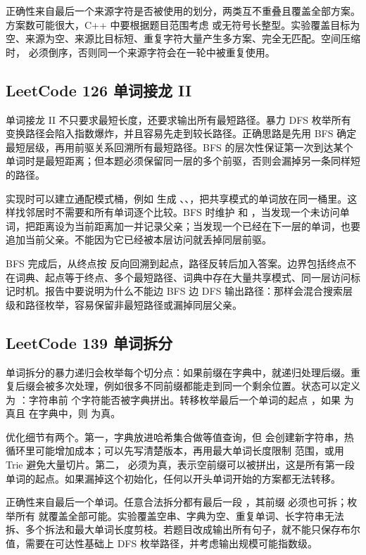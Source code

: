 正确性来自最后一个来源字符是否被使用的划分，两类互不重叠且覆盖全部方案。方案数可能很大，C++ 中要根据题目范围考虑  或无符号长整型。实验覆盖目标为空、来源为空、来源比目标短、重复字符大量产生多方案、完全无匹配。空间压缩时， 必须倒序，否则同一个来源字符会在一轮中被重复使用。

\subsection{LeetCode 126 单词接龙 II}

单词接龙 II 不只要求最短长度，还要求输出所有最短路径。暴力 DFS 枚举所有变换路径会陷入指数爆炸，并且容易先走到较长路径。正确思路是先用 BFS 确定最短层级，再用前驱关系回溯所有最短路径。BFS 的层次性保证第一次到达某个单词时是最短距离；但本题必须保留同一层的多个前驱，否则会漏掉另一条同样短的路径。

实现时可以建立通配模式桶，例如  生成 、、，把共享模式的单词放在同一桶里。这样找邻居时不需要和所有单词逐个比较。BFS 时维护  和 ，当发现一个未访问单词，把距离设为当前距离加一并记录父亲；当发现一个已经在下一层的单词，也要追加当前父亲。不能因为它已经被本层访问就丢掉同层前驱。

BFS 完成后，从终点按  反向回溯到起点，路径反转后加入答案。边界包括终点不在词典、起点等于终点、多个最短路径、词典中存在大量共享模式、同一层访问标记时机。报告中要说明为什么不能边 BFS 边 DFS 输出路径：那样会混合搜索层级和路径枚举，容易保留非最短路径或漏掉同层父亲。

\subsection{LeetCode 139 单词拆分}

单词拆分的暴力递归会枚举每个切分点：如果前缀在字典中，就递归处理后缀。重复后缀会被多次处理，例如很多不同前缀都能走到同一个剩余位置。状态可以定义为 ：字符串前  个字符能否被字典拼出。转移枚举最后一个单词的起点 ，如果  为真且  在字典中，则  为真。

优化细节有两个。第一，字典放进哈希集合做等值查询，但  会创建新字符串，热循环里可能增加成本；可以先写清楚版本，再用最大单词长度限制  范围，或用 Trie 避免大量切片。第二， 必须为真，表示空前缀可以被拼出，这是所有第一段单词的起点。如果漏掉这个初始化，任何以开头单词开始的方案都无法转移。

正确性来自最后一个单词。任意合法拆分都有最后一段 ，其前缀  必须也可拆；枚举所有  就覆盖全部可能。实验覆盖空串、字典为空、重复单词、长字符串无法拆、多个拆法和最大单词长度剪枝。若题目改成输出所有句子，就不能只保存布尔值，需要在可达性基础上 DFS 枚举路径，并考虑输出规模可能指数级。

